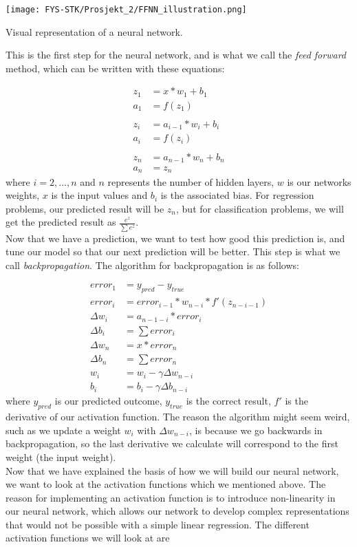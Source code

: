 \documentclass[english,notitlepage,reprint,nofootinbib]{revtex4-1}  %
\begin{document}
\texttt{[image: FYS-STK/Prosjekt\_2/FFNN\_illustration.png]}
\caption{Visual representation of a neural network.}

This is the first step for the neural network, and is what we call the \textit{feed forward} method, which can be written with these equations:

\begin{align*}
    z_1 &= x*w_1 + b_1 \\
    a_1 &= f(z_1) \\
    \\
    z_i &= a_{i-1}*w_i + b_i \\
    a_i &= f(z_i) \\
    \\
    z_n &= a_{n-1}*w_n + b_n \\
    a_n &= z_n
\end{align*}
where $i = 2,...,n$ and $n$ represents the number of hidden layers, $w$ is our networks weights, $x$ is the input values and $b_i$ is the associated bias. For regression problems, our predicted result will be $z_n$, but for classification problems, we will get the predicted result as $\frac{e^z}{\sum e^z}$.
\\
Now that we have a prediction, we want to test how good this prediction is, and tune our model so that our next prediction will be better. This step is what we call \textit{backpropagation}. The algorithm for backpropagation is as follows:

\begin{align*}
    error_1 &= y_{pred} - y_{true} \\ 
    error_i &= error_{i-1} * w_{n-i} * f'(z_{n-i-1}) \\ 
    \Delta w_i &= a_{n-1-i} * error_i \\ 
    \Delta b_i &= \sum error_i \\ 
    \Delta w_n &= x * error_n \\ 
    \Delta b_n &= \sum error_n \\ 
    w_i &= w_i - \gamma \Delta w_{n-i} \\ 
    b_i &= b_i - \gamma \Delta b_{n-i}
\end{align*}
where $y_{pred}$ is our predicted outcome, $y_{true}$ is the correct result, $f'$ is the derivative of our activation function.
The reason the algorithm might seem weird, such as we update a weight $w_i$ with $\Delta w_{n-i}$, is because we go backwards in backpropagation, so the last derivative we calculate will correspond to the first weight (the input weight). 
\\
Now that we have explained the basis of how we will build our neural network, we want to look at the activation functions which we mentioned above. The reason for implementing an activation function is to introduce non-linearity in our neural network, which allows our network to develop complex representations that would not be possible with a simple linear regression.
The different activation functions we will look at are
\end{document}
